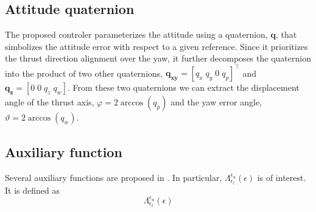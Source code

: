 \documentclass{article}
\begin{document}
		\subsection{Attitude quaternion}
			The proposed controler parameterizes the attitude using a quaternion, $\mathbf{q}$, that simbolizes the attitude error with respect to a given reference. Since it prioritizes the thrust direction alignment over the yaw, it further decomposes the quaternion into the product of two other quaternions, $\mathbf{q_{xy}} = \left [q_x \; q_y \; 0 \; q_p \right]^\top$  and $\mathbf{q_{z}} = \left[0\;0\;q_z\;q_w \right]$. From these two quaternions we can extract the displacement angle of the thrust axis, $\varphi = 2 \arccos(q_p)$ and the yaw error angle, $\vartheta = 2 \arccos(q_w)$. 
		
		\subsection{Auxiliary function}
			Several auxiliary functions are proposed in \cite{lohmann_attitude}. In particular, $\Lambda_{\epsilon_l}^{\epsilon_u}(\epsilon)$ is of interest. It is defined as
			\begin{equation}
				\Lambda_{\epsilon_l}^{\epsilon_u}(\epsilon)
				\label{lambda}
			\end{equation}
\end{document}
